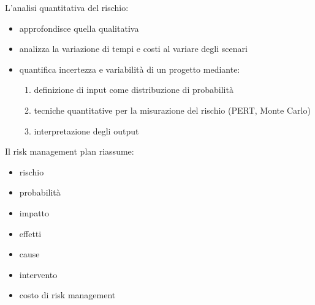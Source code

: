 \documentclass[answers, a4paper, 11pt]{exam}
\begin{document}
L'analisi quantitativa del rischio:

\begin{itemize}
    \item approfondisce quella qualitativa
    \item analizza la variazione di tempi e costi al variare degli scenari
    \item quantifica incertezza e variabilità di un progetto mediante:
    \begin{enumerate}
        \item definizione di input come distribuzione di probabilità
        \item tecniche quantitative per la misurazione del rischio (PERT, Monte Carlo)
        \item interpretazione degli output
    \end{enumerate}
\end{itemize}

Il risk management plan riassume:
\begin{itemize}
    \item rischio
    \item probabilità
    \item impatto
    \item effetti
    \item cause
    \item intervento
    \item costo di risk management
\end{itemize}

\pagebreak
\end{document}
